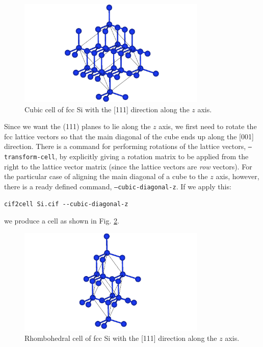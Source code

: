\documentclass[11pt]{article}
\begin{document}
\begin{figure}[htbp] %
   \centering
   \includegraphics[width=0.8\textwidth]{Si_tilt.png} 
   \caption{Cubic cell of fcc Si with the [111] direction along the $z$ axis.}
   \label{tiltSi}
\end{figure}

Since we want the (111) planes to lie along the $z$ axis, we first need to rotate the fcc lattice vectors so that the main diagonal of the cube ends up along the [001] direction. There is a command for performing rotations of the lattice vectors, \texttt{--transform-cell}, by explicitly giving a rotation matrix to be applied from the right to the lattice vector matrix (since the lattice vectors are \emph{row} vectors). For the particular case of aligning the main diagonal of a cube to the $z$ axis, however, there is a ready defined command, \texttt{--cubic-diagonal-z}. If we apply this:
\begin{Verbatim}[fontsize=\footnotesize]
cif2cell Si.cif --cubic-diagonal-z
\end{Verbatim}
we produce a cell as shown in Fig. \ref{rhombSi}.

\begin{figure}[htbp] %
   \centering
   \includegraphics[width=0.8\textwidth]{Si_rhomb.png} 
   \caption{Rhombohedral cell of fcc Si with the [111] direction along the $z$ axis.}
   \label{rhombSi}
\end{figure}
\end{document}
